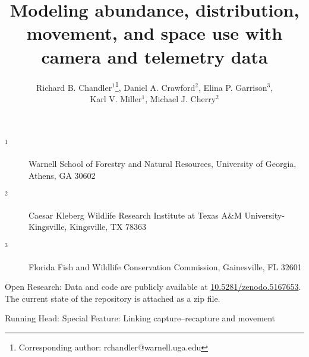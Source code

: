 \documentclass[12pt]{article}
\begin{document}
\title{Modeling abundance, distribution, movement, and space
  use with camera and telemetry data}
\author{Richard B. Chandler$^1$\footnote{Corresponding author: rchandler@warnell.uga.edu}, Daniel A. Crawford$^2$, Elina P. Garrison$^3$, \\
  Karl V. Miller$^1$, Michael J. Cherry$^2$}

\maketitle

\vspace{12pt}

\begin{description}%
\item[$^1$] Warnell School of Forestry and Natural Resources, University of Georgia, Athens, GA 30602 %
\item[$^2$] Caesar Kleberg Wildlife Research Institute at Texas A\&M University-Kingsville, Kingsville, TX 78363 %
\item[$^3$] Florida Fish and Wildlife Conservation Commission, Gainesville, FL 32601 %
\end{description}


\vspace{24pt}

Open Research: Data and code are publicly available at
\url{10.5281/zenodo.5167653}. The current state of the
repository is attached as a zip file.  

Running Head: Special Feature: Linking capture–recapture and movement


\clearpage


\linenumbers
\doublespacing
\end{document}
